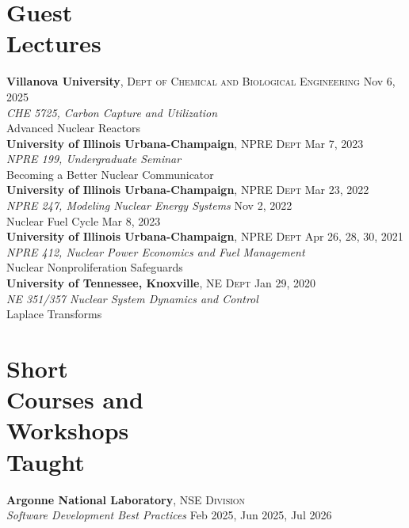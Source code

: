 \documentclass[margin,line]{resume}
\begin{document}
\begin{resume}
    \section{\mysidestyle Guest\\Lectures}
    \textbf{Villanova University}, \textsc{Dept of Chemical and Biological Engineering} \hfill Nov 6, 2025\\
    \textsl{CHE 5725, Carbon Capture and Utilization} \\
    Advanced Nuclear Reactors \vspace{1.5mm}\\
    \textbf{University of Illinois Urbana-Champaign}, \textsc{NPRE Dept} \hfill Mar 7, 2023\\
    \textsl{NPRE 199, Undergraduate Seminar} \\
    Becoming a Better Nuclear Communicator \vspace{1.5mm}\\    
    \textbf{University of Illinois Urbana-Champaign}, \textsc{NPRE Dept} \hfill Mar 23, 2022\\
    \textsl{NPRE 247, Modeling Nuclear Energy Systems} \hfill Nov 2, 2022\\
        Nuclear Fuel Cycle \vspace{1.5mm}\hfill Mar 8, 2023\\
    \textbf{University of Illinois Urbana-Champaign}, \textsc{NPRE Dept} \hfill Apr 26, 28, 30, 2021\\
    \textsl{NPRE 412, Nuclear Power Economics and Fuel Management} \\
        Nuclear Nonproliferation Safeguards \vspace{1.5mm}\\
    \textbf{University of Tennessee, Knoxville}, \textsc{NE Dept} \hfill Jan 29, 2020\\
    \textsl{NE 351/357 Nuclear System Dynamics and Control} \\
        Laplace Transforms
    \section{\mysidestyle Short\\Courses and\\Workshops\\Taught}
    \textbf{Argonne National Laboratory}, \textsc{NSE Division} \\
    \textsl{Software Development Best Practices} \hfill Feb 2025, Jun 2025, Jul 2026\\

\end{resume}
\end{document}
